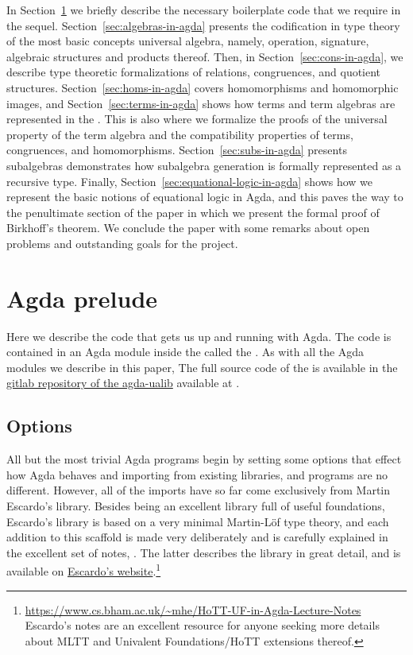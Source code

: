 \documentclass[a4paper,UKenglish,cleveref, autoref, thm-restate]{lipics-v2019}
\begin{document}
In Section~\ref{sec:agda-prelude} we briefly describe the necessary boilerplate code that we require in the sequel.
Section~\ref{sec:algebras-in-agda} presents the codification in type theory of the most basic concepts universal algebra, namely, operation, signature, algebraic structures and products thereof. Then, in Section~\ref{sec:cons-in-agda}, we describe type theoretic formalizations of relations, congruences, and quotient structures. Section~\ref{sec:homs-in-agda} covers homomorphisms and homomorphic images, and Section~\ref{sec:terms-in-agda} shows how terms and term algebras are represented in the \agdaualib. This is also where we formalize the proofs of the universal property of the term algebra and the compatibility properties of terms, congruences, and homomorphisms. Section~\ref{sec:subs-in-agda} presents subalgebras demonstrates how subalgebra generation is formally represented as a recursive type.
Finally, Section~\ref{sec:equational-logic-in-agda} shows how we represent the basic notions of equational logic in Agda, and this paves the way to the penultimate section of the paper in which we present the formal proof of Birkhoff's theorem.  We conclude the paper with some remarks about open problems and outstanding goals for the project.

\section{Agda prelude}\label{sec:agda-prelude}
Here we describe the code that gets us up and running with Agda.  The code is contained in an Agda module inside the \agdaualib called the \preludemodule. As with all the Agda modules we describe in this paper, The full source code of the \preludemodule is available in the \href{https://gitlab.com/ualib/ualib.gitlab.io}{gitlab repository of the agda-ualib} available at \ualibgitlabio.

\subsection{Options}\label{options}
All but the most trivial Agda programs begin by setting some options that effect how Agda behaves and importing from existing libraries, and \agdaualib programs are no different. However, all of the imports have so far come exclusively from Martin Escardo's \typetopology library.  Besides being an excellent library full of useful foundations, Escardo's library is based on a very minimal Martin-L\"of type theory, and each addition to this scaffold is made very deliberately and is carefully explained in the excellent set of notes, \hottufinagda.  The latter describes the \typetopology library in great detail, and is available on \href{https://www.cs.bham.ac.uk/~mhe/HoTT-UF-in-Agda-Lecture-Notes}{Escardo's website}.\footnote{\href{https://www.cs.bham.ac.uk/~mhe/HoTT-UF-in-Agda-Lecture-Notes}{\url{https://www.cs.bham.ac.uk/~mhe/HoTT-UF-in-Agda-Lecture-Notes}}\\
  Escardo's notes are an excellent resource for anyone seeking more details about MLTT and Univalent Foundations/HoTT extensions thereof.}
\end{document}
